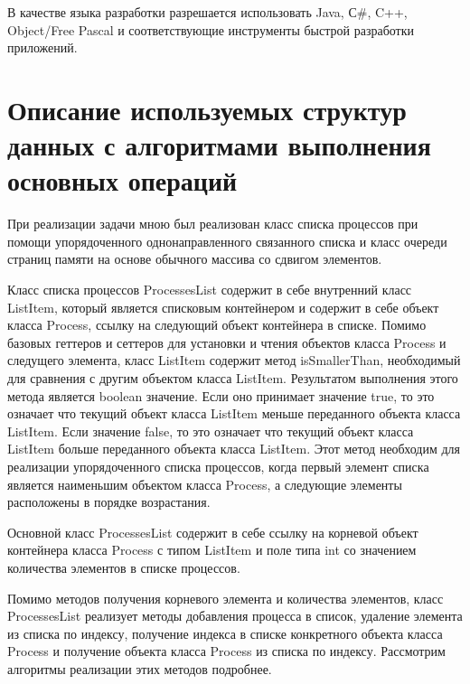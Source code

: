 \documentclass[russian,utf8,simple,hpadding=10mm,vpadding=20mm]{eskdtext}
\begin{document}
В качестве языка разработки разрешается использовать  Java, С#, C++, Object/Free Pascal и соответствующие инструменты быстрой разработки приложений.

\newpage
\parindent=15mm
\doublespacing
\newcommand{\putimage}[3][1]{
  \begin{figure}[!h]
  \center{\texttt{[image: \#2]}}
  \caption{#3}
  \label{ris:#2}
  \end{figure}
}

\section{Описание используемых структур данных с алгоритмами выполнения основных операций}

При реализации задачи мною был реализован класс списка процессов при помощи упорядоченного однонаправленного связанного списка и класс очереди страниц памяти на основе обычного массива со сдвигом элементов.

Класс списка процессов ProcessesList содержит в себе внутренний класс ListItem, который является списковым контейнером и содержит в себе объект класса Process, ссылку на следующий объект контейнера в списке. Помимо базовых геттеров и сеттеров для установки и чтения объектов класса Process и следущего элемента, класс ListItem содержит метод isSmallerThan, необходимый для сравнения с другим объектом класса ListItem. Результатом выполнения этого метода является boolean значение. Если оно принимает значение true, то это означает что текущий объект класса ListItem меньше переданного объекта класса ListItem. Если значение false, то это означает что текущий объект класса ListItem больше переданного объекта класса ListItem. Этот метод необходим для реализации упорядоченного списка процессов, когда первый элемент списка является наименьшим объектом класса Process, а следующие элементы расположены в порядке возрастания.

Основной класс ProcessesList содержит в себе ссылку на корневой объект контейнера класса Process с типом ListItem и поле типа int со значением количества элементов в списке процессов. 

Помимо методов получения корневого элемента и количества элементов, класс ProcessesList реализует методы добавления процесса в список, удаление элемента из списка по индексу, получение индекса в списке конкретного объекта класса Process и получение объекта класса Process из списка по индексу. Рассмотрим алгоритмы реализации этих методов подробнее.
\end{document}

